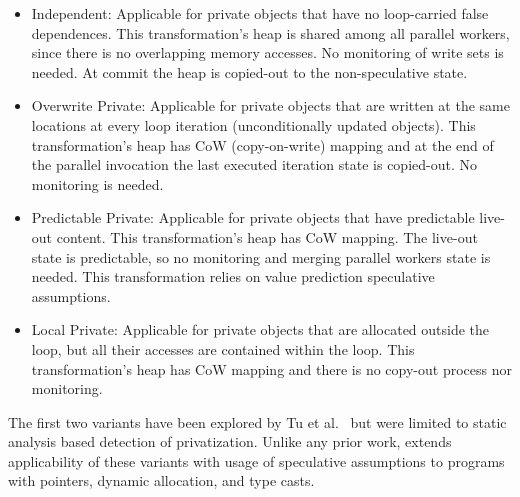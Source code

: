 \begin{itemize}
%
\item Independent: Applicable for private objects that have no
loop-carried false dependences. This transformation's heap is shared
among all parallel workers, since there is no overlapping memory
accesses.
%
No monitoring of write sets is needed. At commit the heap is copied-out
to the non-speculative state.
%


\item Overwrite Private: Applicable for private objects that are
written at the same locations at every loop iteration (unconditionally
updated objects). This transformation's heap has CoW (copy-on-write) mapping
and at the end of the parallel invocation the last executed iteration
state is copied-out. No monitoring is needed.

%

\item Predictable Private: Applicable for private objects that have
predictable live-out content. This transformation's heap has CoW mapping. The
live-out state is predictable, so no monitoring and merging parallel
workers state is needed. This transformation relies on value
prediction speculative assumptions.

\item Local Private: Applicable for private objects that are allocated
outside the loop, but all their accesses are contained within the
loop. This transformation's heap has CoW mapping and there is no copy-out
process nor monitoring.

\end{itemize}

The first two variants have been explored by Tu et
al.~\cite{ARRAY_privatization} but were limited to static analysis
based detection of privatization.  Unlike any prior work, \name
extends applicability of these variants with usage of speculative
assumptions to programs with pointers, dynamic allocation, and type
casts.

